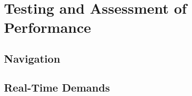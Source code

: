 \section{Testing and Assessment of Performance}

\subsection{Navigation}

\subsection{Real-Time Demands}

